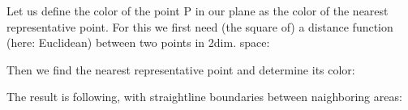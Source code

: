 \documentclass[letterpaper,10pt,english]{jupyterBook}
\begin{document}
\sphinxAtStartPar
Let us define the color of the point P in our plane as the color of the nearest representative point. For this we first need (the square of) a distance function (here: Euclidean) between two points in 2\sphinxhyphen{}dim. space:

\begin{sphinxVerbatim}[commandchars=\\\{\}]
  
     \PYG{p}{[}\PYG{p}{]}\PYG{p}{[}\PYG{p}{]}\PYG{p}{[}\PYG{p}{]}\PYG{p}{[}\PYG{p}{]}
\end{sphinxVerbatim}

\sphinxAtStartPar
Then we find the nearest representative point and determine its color:

\begin{sphinxVerbatim}[commandchars=\\\{\}]
 
    \PYG{p}{[}\PYG{p}{]}
       
     \PYG{p}{[}\PYG{p}{]}
\end{sphinxVerbatim}

\begin{sphinxVerbatim}[commandchars=\\\{\}]
\PYG{p}{[}\PYG{p}{]}
\end{sphinxVerbatim}

\sphinxAtStartPar
The result is following, with straight\sphinxhyphen{}line boundaries between naighboring areas:
\end{document}
